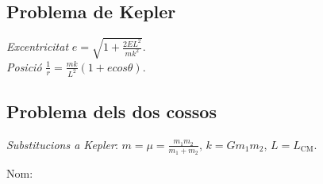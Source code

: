 \documentclass[11pt]{article}
\newcommand{\lp}{\left(}
\newcommand{\rp}{\right)}
\begin{document}
\begin{multicols}{4}
\subsection{Problema de Kepler}
\emph{Excentricitat} $e = \sqrt{1 + \frac{2EL^2}{mk^2}}$.\\
\emph{Posició} $\frac{1}{r} = \frac{mk}{L^2} \lp 1 + e cos \theta \rp$.

\subsection{Problema dels dos cossos}
\emph{Substitucions a Kepler}: $m = \mu = \frac{m_1m_2}{m_1+m_2},\, k = Gm_1m_2, \, L = L_\text{CM}$.

\ifland
\noindent\makebox[\linewidth]{\rule{\linewidth}{0.5pt}}
\vspace{3pt}
\raggedleft
{\Large Nom: \underline{\hspace{5cm}}}


\end{multicols}

\fi
\end{document}
